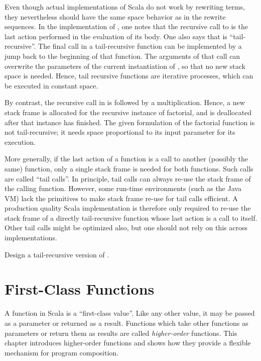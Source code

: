 Even though actual implementations of Scala do not work by rewriting
terms, they nevertheless should have the same space behavior as in the
rewrite sequences. In the implementation of , one notes that
the recursive call to  is the last action performed in the
evaluation of its body. One also says that  is
``tail-recursive''. The final call in a tail-recursive function can be
implemented by a jump back to the beginning of that function. The
arguments of that call can overwrite the parameters of the current
instantiation of , so that no new stack space is needed.
Hence, tail recursive functions are iterative processes, which can be
executed in constant space.

By contrast, the recursive call in  is followed by a
multiplication.  Hence, a new stack frame is allocated for the
recursive instance of factorial, and is deallocated after that
instance has finished. The given formulation of the factorial function
is not tail-recursive; it needs space proportional to its input
parameter for its execution.

More generally, if the last action of a function is a call to another
(possibly the same) function, only a single stack frame is needed for
both functions. Such calls are called ``tail calls''. In principle,
tail calls can always re-use the stack frame of the calling function.
However, some run-time environments (such as the Java VM) lack the
primitives to make stack frame re-use for tail calls efficient.  A
production quality Scala implementation is therefore only required to
re-use the stack frame of a directly tail-recursive function whose
last action is a call to itself.  Other tail calls might be optimized
also, but one should not rely on this across implementations.

\begin{exercise} Design a tail-recursive version of
.
\end{exercise}

\chapter{\label{chap:first-class-funs}First-Class Functions}

A function in Scala is a ``first-class value''. Like any other value,
it may be passed as a parameter or returned as a result.  Functions
which take other functions as parameters or return them as results are
called {\em higher-order} functions. This chapter introduces
higher-order functions and shows how they provide a flexible mechanism
for program composition.

